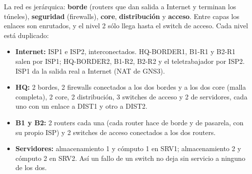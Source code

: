 \documentclass[11pt,a4paper]{article}
\begin{document}
La red es jerárquica: \textbf{borde} (routers que dan salida a Internet y terminan los túneles), \textbf{seguridad} (firewalls), \textbf{core}, \textbf{distribución} y \textbf{acceso}. Entre capas los enlaces son enrutados, y el nivel 2 sólo llega hasta el switch de acceso. Cada nivel está duplicado:
\begin{itemize}
\item \textbf{Internet:} ISP1 e ISP2, interconectados. HQ-BORDER1, B1-R1 y B2-R1 salen por ISP1; HQ-BORDER2, B1-R2, B2-R2 y el teletrabajador por ISP2. ISP1 da la salida real a Internet (NAT de GNS3).
\item \textbf{HQ:} 2 bordes, 2 firewalls conectados a los dos bordes y a los dos core (malla completa), 2 core, 2 distribución, 3 switches de acceso y 2 de servidores, cada uno con un enlace a DIST1 y otro a DIST2.
\item \textbf{B1 y B2:} 2 routers cada una (cada router hace de borde y de pasarela, con su propio ISP) y 2 switches de acceso conectados a los dos routers.
\item \textbf{Servidores:} almacenamiento 1 y cómputo 1 en SRV1; almacenamiento 2 y cómputo 2 en SRV2. Así un fallo de un switch no deja sin servicio a ninguno de los dos.
\end{itemize}
\end{document}
